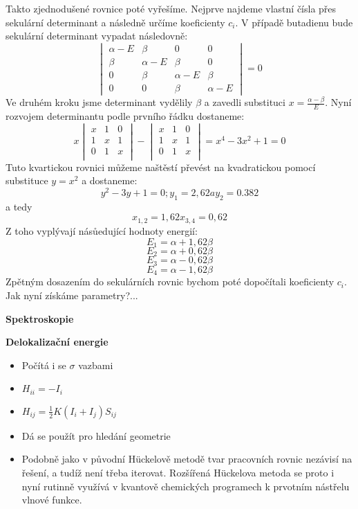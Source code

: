 Takto zjednodušené rovnice poté vyřešíme. Nejprve najdeme vlastní čísla přes sekulární determinant a následně určíme koeficienty $c_i$. V případě butadienu bude sekulární determinant vypadat následovně:
\begin{equation}
\begin{vmatrix}
\alpha-E & \beta & 0 & 0  \\
\beta &\alpha-E & \beta & 0  \\
0 &\beta &\alpha-E & \beta  \\
0 & 0 & \beta &\alpha-E   
\end{vmatrix}
= 0
\end{equation}
Ve druhém kroku jsme determinant vydělily $\beta$ a zavedli substituci $x=\frac{\alpha-\beta}{E}$.
Nyní rozvojem determinantu podle prvního řádku dostaneme:
\begin{equation}
x
\begin{vmatrix}
x & 1 & 0 \\
1 & x & 1 \\
0 & 1 & x \\
\end{vmatrix}
-
\begin{vmatrix}
x & 1 & 0 \\
1 & x & 1 \\
0 & 1 & x \\
\end{vmatrix}
=x^4-3x^2+1=0
\end{equation}
Tuto kvartickou rovnici můžeme naštěstí převést na kvadratickou pomocí substituce $y=x^2$ a dostaneme:
\begin{equation}
y^2-3y+1=0; y_1=2,62 a y_2=0.382
\end{equation}
a tedy
\begin{equation}
x_{1,2}=1,62
x_{3,4}=0,62
\end{equation}
Z toho vyplývají násůedující hodnoty energií:
$$ E_1 = \alpha+1,62\beta $$
$$ E_2 = \alpha+0,62\beta $$
$$ E_3 = \alpha-0,62\beta $$
$$ E_4 = \alpha-1,62\beta $$
Zpětným dosazením do sekulárních rovnic bychom poté dopočítali koeficienty $c_i$.
Jak nyní získáme parametry?...

\textbf{Spektroskopie}

\textbf{Delokalizační energie}


\begin{itemize}
\item Počítá i se $\sigma$ vazbami
\item $H_{ii}=-I_i$
\item $H_{ij}=\frac{1}{2}K(I_i+I_j)S_{ij}$
\item Dá se použít pro hledání geometrie
\item Podobně jako v původní H\"{u}ckelově metodě tvar pracovních rovnic nezávisí na řešení, a tudíž není třeba iterovat. Rozšířená H\"{u}ckelova metoda se proto i nyní rutinně využívá v kvantově chemických programech k prvotním nástřelu vlnové funkce.
\end{itemize}


